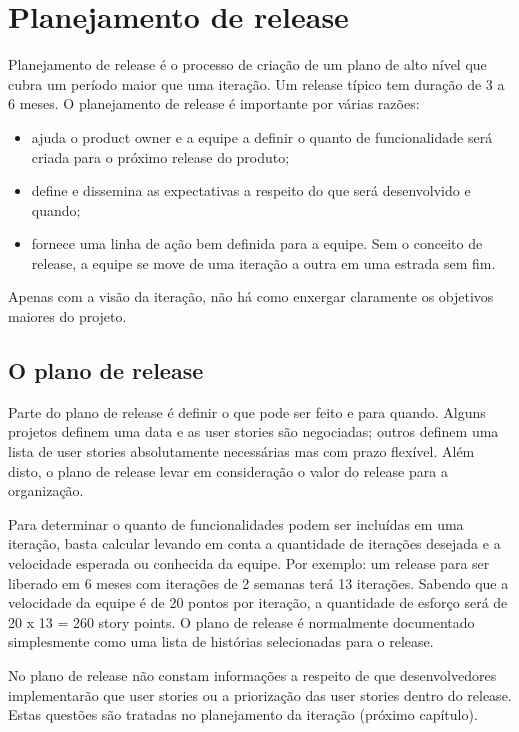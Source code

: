 \documentclass[a4paper,abntfigtabnum,noindentfirst]{abnt}
\begin{document}
\chapter{Planejamento de release}


Planejamento de release é o processo de criação de um plano de alto nível que cubra um período maior que uma iteração. Um release típico tem duração de 3 a 6 meses. O planejamento de release é importante por várias razões:
\begin{itemize}
\item ajuda o product owner e a equipe a definir o quanto de funcionalidade será criada para o próximo release do produto;
\item define e dissemina as expectativas a respeito do que será desenvolvido e quando;
\item fornece uma linha de ação bem definida para a equipe. Sem o conceito de release, a equipe se move de uma iteração a outra em uma estrada sem fim.
\end{itemize}
Apenas com a visão da iteração, não há como enxergar claramente os objetivos maiores do projeto.

\section{O plano de release}

Parte do plano de release é definir o que pode ser feito e para quando. Alguns projetos definem uma data e as user stories são negociadas; outros definem uma lista de user stories absolutamente necessárias mas com prazo flexível. Além disto, o plano de release levar em consideração o valor do release para a organização.

Para determinar o quanto de funcionalidades podem ser incluídas em uma iteração, basta calcular levando em conta a quantidade de iterações desejada e a velocidade esperada ou conhecida da equipe. Por exemplo: um release para ser liberado em 6 meses com iterações de 2 semanas terá 13 iterações. Sabendo que a velocidade da equipe é de 20 pontos por iteração, a quantidade de esforço será de 20 x 13 = 260 story points. O plano de release é normalmente documentado simplesmente como uma lista de histórias selecionadas para o release.

No plano de release não constam informações a respeito de que desenvolvedores implementarão que user stories ou a priorização das user stories dentro do release. Estas questões são tratadas no planejamento da iteração (próximo capítulo).
\end{document}
